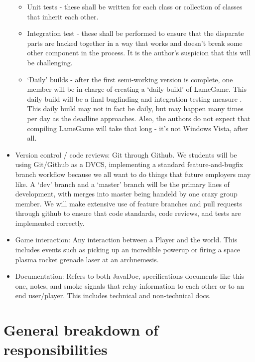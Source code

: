 \documentclass[titlepage]{article}\usepackage[]{graphicx}\usepackage[]{color}
\begin{document}
\begin{itemize}
  \begin{itemize}
  \itemsep1pt\parskip0pt
  \item
    Unit tests - these shall be written for each class or collection of
    classes that inherit each other.
  \item
    Integration test - these shall be performed to ensure that the
    disparate parts are hacked together in a way that works and doesn't
    break some other component in the process. It is the author's
    suspicion that this will be challenging.
  \item
    `Daily' builds - after the first semi-working version is complete,
    one member will be in charge of creating a `daily build' of
    LameGame. This daily build will be a final bugfinding and
    integration testing measure . This daily build may not in fact be
    daily, but may happen many times per day as the deadline approaches.
    Also, the authors do not expect that compiling LameGame will take
    that long - it's not Windows Vista, after all.
  \end{itemize}
\item
  Version control / code reviews: Git through Github. We students will
  be using Git/Github as a DVCS, implementing a standard
  feature-and-bugfix branch workflow because we all want to do things
  that future employers may like. A `dev' branch and a `master' branch
  will be the primary lines of development, with merges into master
  being handeld by one crazy group member. We will make extensive use of
  feature branches and pull requests through github to ensure that code
  standards, code reviews, and tests are implemented correctly.
\item
  Game interaction: Any interaction between a Player and the world. This
  includes events such as picking up an incredible powerup or firing a
  space plasma rocket grenade laser at an archnemesis.
\item
  Documentation: Refers to both JavaDoc, specifications documents like
  this one, notes, and smoke signals that relay information to each
  other or to an end user/player. This includes technical and
  non-technical docs.
\end{itemize}

\section{General breakdown of
responsibilities}\label{general-breakdown-of-responsibilities}
\end{document}
